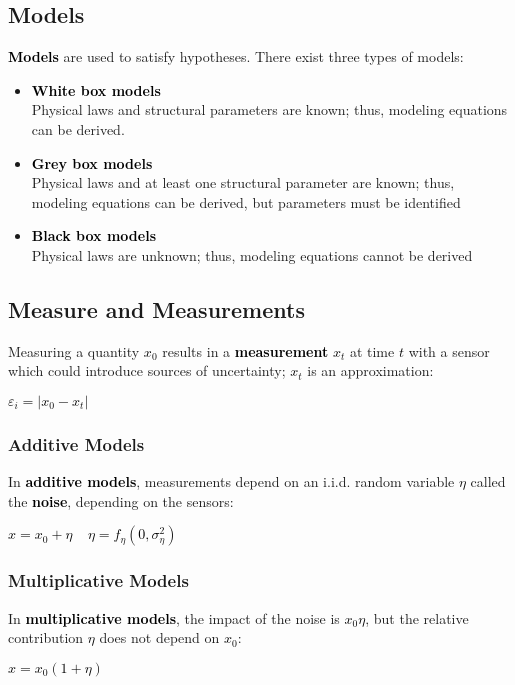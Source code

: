 \documentclass{article}
\newcommand{\bb}[1]{\textcolor{black}{\textbf{#1}}}
\newcommand{\rr}[1]{\textcolor{black}{#1}}
\newcommand{\cc}[1]{\begin{center}\textcolor{black}{#1}\end{center}}
\begin{document}
\subsection{Models}
\bb{Models} are used to satisfy hypotheses. There exist three types of models:
\begin{itemize}
    \item \bb{White box models}
        \vspace{0.2cm} \\
        Physical laws and structural parameters are known; thus, modeling equations can be derived.
    \item \bb{Grey box models}
        \vspace{0.2cm} \\
        Physical laws and at least one structural parameter are known; thus, modeling equations can be derived, but parameters must be identified
    \item \bb{Black box models}
        \vspace{0.2cm} \\
        Physical laws are unknown; thus, modeling equations cannot be derived
\end{itemize}

\subsection{Measure and Measurements}
Measuring a quantity \rr{$x_0$} results in a \bb{measurement} \rr{$x_t$} at time \rr{$t$} with a sensor which could introduce sources of uncertainty; \rr{$x_t$} is an approximation:
\cc{$\varepsilon_i = | x_0 - x_t |$}

\subsubsection{Additive Models}
In \bb{additive models}, measurements depend on an i.i.d. random variable \rr{$\eta$} called the \bb{noise}, depending on the sensors:
\cc{$x = x_0 + \eta \ \ \ \ \ \eta = f_{\eta}(0,\sigma^2_{\eta})$}
\subsubsection{Multiplicative Models}
In \bb{multiplicative models}, the impact of the noise is \rr{$x_0\eta$}, but the relative contribution \rr{$\eta$} does not depend on \rr{$x_0$}:
\cc{$x = x_0(1 + \eta)$}
\end{document}
